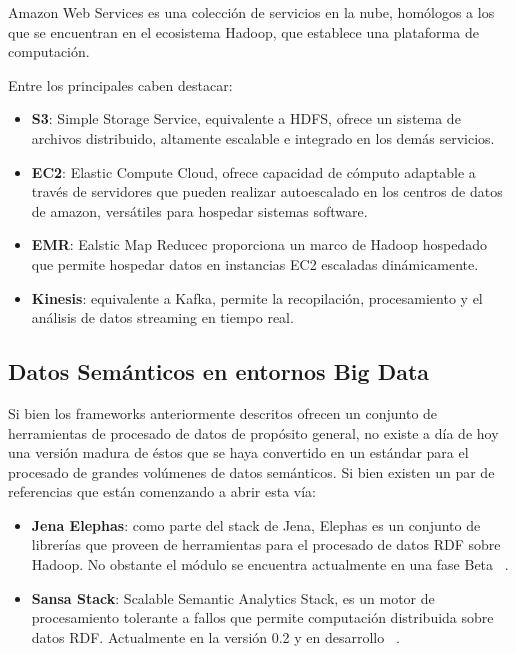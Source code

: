 Amazon Web Services es una colección de servicios en la nube, homólogos a los
que se encuentran en el ecosistema Hadoop, que establece una plataforma de
computación.

Entre los principales caben destacar:

\begin{itemize}
\item \textbf{S3}: Simple Storage Service, equivalente a HDFS, ofrece un sistema de archivos
  distribuido, altamente escalable e integrado en los demás servicios. 
\item \textbf{EC2}: Elastic Compute Cloud, ofrece capacidad de cómputo adaptable
  a través de servidores que pueden realizar autoescalado en los centros de
  datos de amazon, versátiles para hospedar sistemas software. 
\item \textbf{EMR}: Ealstic Map Reducec proporciona un marco de Hadoop hospedado que permite
  hospedar datos en instancias EC2 escaladas dinámicamente. 
\item \textbf{Kinesis}: equivalente a Kafka, permite la recopilación,
  procesamiento y el análisis de datos streaming en tiempo real. 
\end{itemize}


\subsection{Datos Semánticos en entornos Big Data}

Si bien los frameworks anteriormente descritos ofrecen un conjunto de
herramientas de procesado de datos de propósito general, no existe a día de hoy
una versión madura de éstos que se haya convertido en un estándar para el
procesado de grandes volúmenes de datos semánticos. Si bien existen un par de
referencias que están comenzando a abrir esta vía: 

\begin{itemize}
\item \textbf{Jena Elephas}: como parte del stack de Jena, Elephas es un
  conjunto de librerías que proveen de herramientas para el procesado de datos
  RDF sobre Hadoop. No obstante el módulo se encuentra actualmente en una fase
  Beta ~\cite{JENE:jena-elephas}. 
\item \textbf{Sansa Stack}: Scalable Semantic Analytics Stack, es un motor de
  procesamiento tolerante a fallos que permite computación distribuida sobre
  datos RDF. Actualmente en la versión 0.2 y en desarrollo ~\cite{SANSA-stack}.
\end{itemize}

